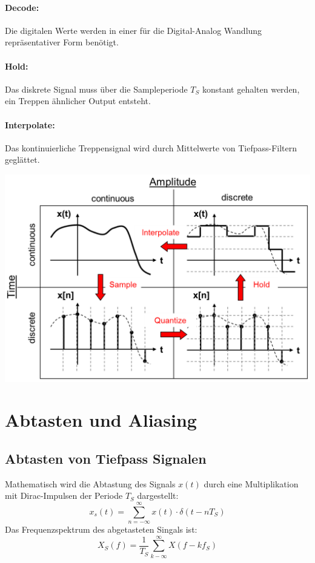 \paragraph{Decode:} Die digitalen Werte werden in einer für die Digital-Analog
Wandlung repräsentativer Form benötigt.

\paragraph{Hold:} Das diskrete Signal muss über die Sampleperiode $T_S$ konstant
gehalten werden, ein Treppen ähnlicher Output entsteht.

\paragraph{Interpolate:} Das kontinuierliche Treppensignal wird durch Mittelwerte
von Tiefpass-Filtern geglättet.

\begin{center}
	\includegraphics[scale=.7]{../fig/ad_da}
\end{center}

\section{Abtasten und Aliasing}
\subsection{Abtasten von Tiefpass Signalen}
Mathematisch wird die Abtastung des Signals $x(t)$ durch eine Multiplikation
mit Dirac-Impulsen der Periode $T_S$ dargestellt:
\[ x_s(t) = \sum_{n=-\infty}^{\infty} x(t) \cdot \delta(t-nT_S) \]
Das Frequenzspektrum des abgetasteten Singals ist:
\[ X_S(f) = \frac{1}{T_S} \sum_{k-\infty}^{\infty} X(f-kf_S) \]

